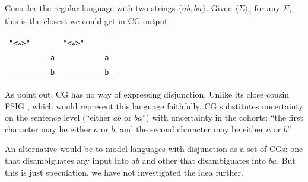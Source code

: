 \documentclass[11pt]{article}
\def\wwf{\t{"<w>"}}
\def\swf{\t{"<s>"}}
\def\t#1{\texttt{#1}}
\def\maxAmb#1{$\langle \Sigma \rangle_#1$}
\def\maxAmbFSA#1{$\langle \Sigma,S \rangle_#1$}
\begin{document}
Consider the regular language with two strings $\{ab,ba\}$. 
Given \maxAmb{2} for any $\Sigma$, this is the closest we could get in CG output:

\begin{table}[h]
\begin{tabular}{l l}

 \wwf          &  \wwf  \\
 ~~~~~~~~~~\t{a}  &  ~~~~~~~~~~\t{a}  \\
 ~~~~~~~~~~\t{b}  &  ~~~~~~~~~~\t{b}
\end{tabular}
\end{table}

As  point out, CG has no way of expressing disjunction.
Unlike its close cousin FSIG \cite{koskenniemi90}, which would represent this language
faithfully, CG substitutes uncertainty on the sentence level (``either $ab$ or $ba$'')
with uncertainty in the cohorts:
``the first character may be either $a$ or $b$, and the second character may be either $a$ or $b$''.

An alternative would be to model languages with disjunction as a set of CGs: 
one that disambiguates any input into $ab$ and other that disambiguates 
into $ba$. But this is just speculation, we have not investigated the idea further. 




\end{document}
